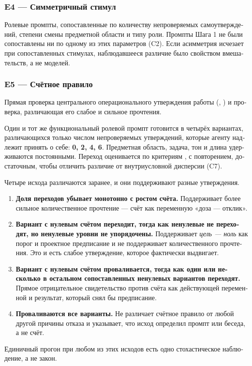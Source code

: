 \begin{russian}
\subsubsection*{E4 — Симметричный стимул}
\label{sec:ru:x-e4}

Ролевые промпты, сопоставленные по количеству непроверяемых самоутверждений, степени смены предметной области и типу роли. Промпты Шага 1 не были сопоставлены ни по одному из этих параметров (C2). Если асимметрия исчезает при сопоставленных стимулах, наблюдавшееся различие было свойством вмешательств, а не моделей.


\subsubsection*{E5 — Счётное правило}
\label{sec:ru:x-e5}

Прямая проверка центрального операционального утверждения работы (, ) и проверка, различающая его слабое и сильное прочтения.

Один и тот же функциональный ролевой промпт готовится в четырёх вариантах, различающихся только числом непроверяемых утверждений, которые агенту надлежит принять о себе: \textbf{0, 2, 4, 6}. Предметная область, задача, тон и длина удерживаются постоянными. Переход оценивается по критериям , с повторением, достаточным, чтобы отличить различие от внутриусловной дисперсии (C7).

Четыре исхода различаются заранее, и они поддерживают разные утверждения.

\begin{enumerate}
  \item \textbf{Доля переходов убывает монотонно с ростом счёта.} Поддерживает более сильное количественное прочтение — счёт как переменную «доза — отклик».
  \item \textbf{Вариант с нулевым счётом переходит, тогда как ненулевые не переходят, но ненулевые уровни не упорядочены.} Поддерживает \emph{цель — ноль} как порог и проектное предписание и не поддерживает количественного прочтения. Это и есть слабое утверждение, которое  фактически выдвигает.
  \item \textbf{Вариант с нулевым счётом проваливается, тогда как один или несколько в остальном сопоставленных ненулевых вариантов переходят.} Прямое отрицательное свидетельство против счёта как действующей переменной и результат, который снял бы предписание.
  \item \textbf{Проваливаются все варианты.} Не различает счётное правило от любой другой причины отказа и указывает, что исход определил промпт или беседа, а не счёт.
\end{enumerate}
Единичный прогон при любом из этих исходов есть одно стохастическое наблюдение, а не закон.



\end{russian}
